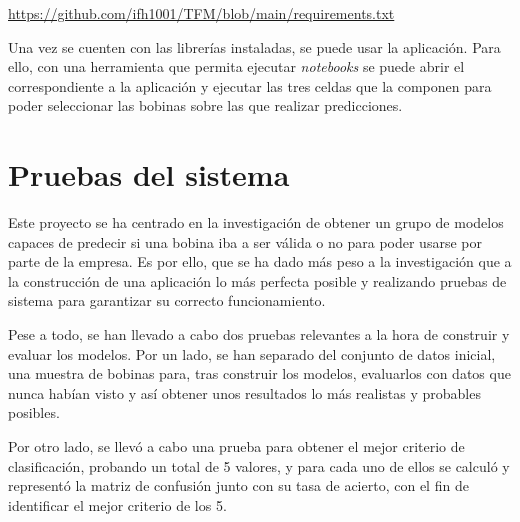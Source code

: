 \url{https://github.com/ifh1001/TFM/blob/main/requirements.txt}

Una vez se cuenten con las librerías instaladas, se puede usar la aplicación. Para ello, con una herramienta que permita ejecutar \emph{notebooks} se puede abrir el correspondiente a la aplicación y ejecutar las tres celdas que la componen para poder seleccionar las bobinas sobre las que realizar predicciones.

\section{Pruebas del sistema}
Este proyecto se ha centrado en la investigación de obtener un grupo de modelos capaces de predecir si una bobina iba a ser válida o no para poder usarse por parte de la empresa. Es por ello, que se ha dado más peso a la investigación que a la construcción de una aplicación lo más perfecta posible y realizando pruebas de sistema para garantizar su correcto funcionamiento.

Pese a todo, se han llevado a cabo dos pruebas relevantes a la hora de construir y evaluar los modelos. Por un lado, se han separado del conjunto de datos inicial, una muestra de bobinas para, tras construir los modelos, evaluarlos con datos que nunca habían visto y así obtener unos resultados lo más realistas y probables posibles.

Por otro lado, se llevó a cabo una prueba para obtener el mejor criterio de clasificación, probando un total de 5 valores, y para cada uno de ellos se calculó y representó la matriz de confusión junto con su tasa de acierto, con el fin de identificar el mejor criterio de los 5.